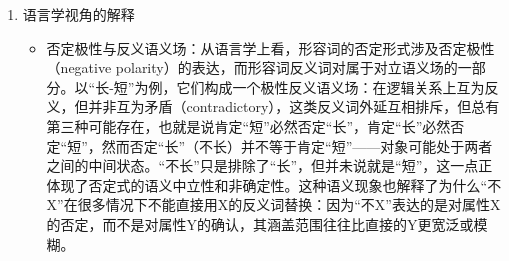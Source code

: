 \documentclass[10pt]{ctexart}
\begin{document}
\begin{enumerate}
\begin{itemize}
        \item 语境适用范围
 
        否定形式与反义词在使用场合上也有所区别。``不X''由于语义相对中和，经常出现在礼貌寒暄、谦辞自谦或委婉拒绝等场合。例如主人常说``家里地方不大，请见谅''，用``不大''来含蓄表达房子小但态度谦和。而直接说``地方很小''在此场合则显得不够客气。再如自我评价时，说``我成绩不太好''比直言``我成绩差''更委婉自谦。在疑问句中也体现出差异：人们提问时往往使用未标记的正向形容词或其否定形式，如问``路远不远？''，而不大说``路近不近？''，因为默认以``远''作为尺度。只有当说话人预期或担心某性质为反向时，才可能用反义词发问。因此，``不X''形式更灵活适应各种上下文，不会过早断定语义方向；反义词Y则多在说话者有明确判断或强调时使用。

        \item 含义暗示 vs. 明示
        
        使用否定形式往往带有一定暗示性，需要根据语境领会真实程度。例如``这菜不辣''可能暗示菜的辣度偏低或适中，但并不明确说菜是``淡''的；而若说``这菜很淡''则明白指出味道清淡无辣味。在社交语用中，这种暗示性的模糊策略有助于听者自行体会，不至于产生强烈情感反应。反之，直接反义词属于明示表达，优点是清晰直接，但语义也更绝对：说``他脾气差''就毫不避讳地给出了负面评价，听者无需猜测但可能感到冒犯。可见，在需要措辞婉转或避免确定性陈述时，否定形式更合适；而在需要强调鲜明立场时，反义词更能达意。
    \end{itemize}

    \item 语言学视角的解释
    \begin{itemize}
        \item 否定极性与反义语义场：从语言学上看，形容词的否定形式涉及否定极性（negative polarity）的表达，而形容词反义词对属于对立语义场的一部分。以``长-短''为例，它们构成一个极性反义语义场：在逻辑关系上互为反义，但并非互为矛盾（contradictory），这类反义词外延互相排斥，但总有第三种可能存在，也就是说肯定``短''必然否定``长''，肯定``长''必然否定``短''，然而否定``长''（不长）并不等于肯定``短''——对象可能处于两者之间的中间状态。``不长''只是排除了``长''，但并未说就是``短''，这一点正体现了否定式的语义中立性和非确定性。这种语义现象也解释了为什么``不X''在很多情况下不能直接用X的反义词替换：因为``不X''表达的是对属性X的否定，而不是对属性Y的确认，其涵盖范围往往比直接的Y更宽泛或模糊。
        

\end{itemize}
\end{enumerate}
\end{document}
